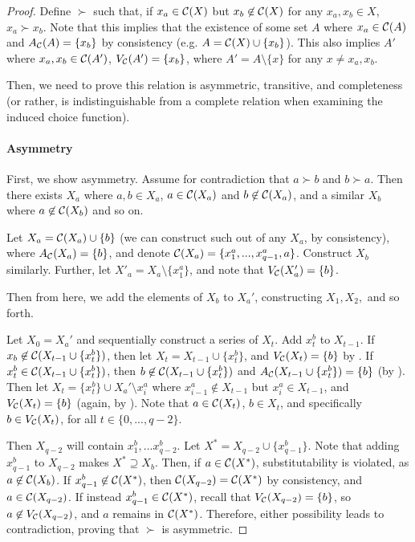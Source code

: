 \begin{proof}
Define $\succ$ such that, if $x_a \in \mathcal{C}(X)$ but $x_b \not\in\mathcal{C}(X)$ for any $x_a, x_b \in X$, $x_a \succ x_b$. Note that this implies that the existence of some set $A$ where $x_a \in \mathcal{C}(A)$ and $A_{\mathcal{C}}(A) = \{x_b\}$ by consistency (e.g. $A = \mathcal{C}(X) \cup \{x_b\}$). This also implies $A'$ where $x_a, x_b \in \mathcal{C}(A')$, $V_{\mathcal{C}}(A') = \{x_b\}$, where $A' = A \setminus \{x\}$ for any $x \neq x_a, x_b$.

Then, we need to prove this relation is asymmetric, transitive, and completeness (or rather, is indistinguishable from a complete relation when examining the induced choice function).

\paragraph{Asymmetry}
First, we show asymmetry. Assume for contradiction that $a \succ b$ and $b \succ a$. Then there exists $X_a$ where $a, b \in X_a$, $a \in \mathcal{C}(X_a)$ and $b \not\in \mathcal{C}(X_a)$, and a similar $X_b$ where $a \not\in \mathcal{C}(X_b)$ and so on.

Let $X_a = \mathcal{C}(X_a) \cup \{b\}$ (we can construct such out of any $X_a$, by consistency), where $A_{\mathcal{C}}(X_a) = \{b\}$, and denote $\mathcal{C}(X_a) = \{x^a_1, ..., x^a_{q-1}, a\}$. Construct $X_b$ similarly. Further, let $X'_a = X_a \setminus \{x^a_1\}$, and note that $V_{\mathcal{C}}(X_a') = \{b\}$.

Then from here, we add the elements of $X_b$ to $X_a'$, constructing $X_1, X_2,$ and so forth.

Let $X_0 = X_a'$ and sequentially construct a series of $X_t$. Add $x^b_t$ to $X_{t-1}$. If $x_b \not\in \mathcal{C}(X_{t-1} \cup \{x^b_t\})$, then let $X_t = X_{t-1} \cup \{x^b_t\}$, and $V_{\mathcal{C}}(X_t) = \{b\}$ by . If $x^b_t \in \mathcal{C}(X_{t-1} \cup \{x^b_t\})$, then $b \not\in \mathcal{C}(X_{t-1} \cup \{x^b_t\})$ and $A_{\mathcal{C}}(X_{t-1} \cup \{x^b_t\}) = \{b\}$ (by ). Then let $X_t = \{x^b_t\} \cup X_a' \setminus x^a_i$ where $x^a_{i-1} \not\in X_{t-1}$ but $x^a_i \in X_{t-1}$, and $V_{\mathcal{C}}(X_t) = \{b\}$ (again, by ). Note that $a \in \mathcal{C}(X_t)$, $b \in X_t$, and specifically $b \in V_{\mathcal{C}}(X_t)$, for all $t \in \{0,..., q-2\}$.

Then $X_{q-2}$ will contain $x^b_1,...x^b_{q-2}$. Let $X^* = X_{q-2} \cup \{x^b_{q-1}\}$. Note that adding $x^b_{q-1}$ to $X_{q-2}$ makes $X^* \supseteq X_b$. Then, if $a \in \mathcal{C}(X^*)$, substitutability is violated, as $a \not\in \mathcal{C}(X_b)$. If $x^b_{q-1} \not\in \mathcal{C}(X^*)$, then $\mathcal{C}(X_{q-2}) = \mathcal{C}(X^*)$ by consistency, and $a \in \mathcal{C}(X_{q-2})$. If instead $x^b_{q-1} \in \mathcal{C}(X^*)$, recall that $V_{\mathcal{C}}(X_{q-2}) = \{b\}$, so $a \not\in V_{\mathcal{C}}(X_{q-2})$, and $a$ remains in $\mathcal{C}(X^*)$. Therefore, either possibility leads to contradiction, proving that $\succ$ is asymmetric.


\end{proof}

